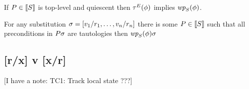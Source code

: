\begin{proposition}
  If $P\in\llbracket S\rrbracket$ is top-level and quiescent then 
  $\aTr{\aEvs}{\aForm}$ implies $\fwp{\aCmd}{\aForm}$.

  For any substitution $\sigma=[{v_1/r_1},\ldots, {v_n/r_n}]$ there is some
  $P\in\llbracket S\rrbracket$ %
  such that all preconditions in $P\sigma$ are tautologies then 
  $\fwp{\aCmd}{\aForm}\aSub$
\end{proposition}

\subsection{[r/x] v [x/r]}

[I have a note: TC1: Track local state ???]

